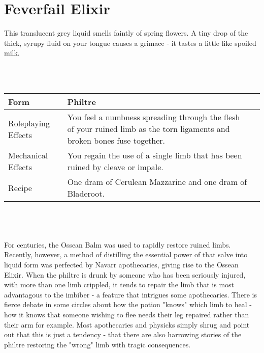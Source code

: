 \documentclass[a5paper,pagesize,10pt,bibtotoc,pointlessnumbers,
normalheadings,DIV=9,twoside=false]{scrbook}
\newcommand\potion[7]{
    \section{#1}
    #2
    \\\\
    \begin{tabular}{| p{.18\linewidth} | p{.74\textwidth} |}
        \hline
        Form & #3 \\
        \hline
        Roleplaying Effects & #4 \\
        \hline
        Mechanical Effects & #5 \\
        \hline
        Recipe & #6 \\
        \hline
    \end{tabular}
    \\\\\\
    #7
    \newpage
}
\begin{document}
\potion{Feverfail Elixir}{
    This translucent grey liquid smells faintly of spring flowers. A tiny drop of the thick, syrupy fluid on your tongue causes a grimace - it tastes a little like spoiled milk.
}{Philtre}{
    You feel nauseous. A dizzying chill spreads through your body, leaving you incapacitated for a few moments. Both effects clear as quickly as they arose, leaving you feeling revitalised.
}{
    You lose the weakness condition.
}{
    One dram of Bladeroot and one dram of Imperial Roseweald.
}{
    This elixir drives out the lingering effects of enervation. It is occasionally useful in treating symptoms that include excessive tiredness or dizziness.
}

\potion{Ossean Solution}{
    This thick, odourless, blue liquid has a gritty texture. When you rub it between finger and thumb it leaves a crusty residue that soon flakes away. It tastes disgusting.
}{Philtre}{
    You feel a numbness spreading through the flesh of your ruined limb as the torn ligaments and broken bones fuse together.
}{
    You regain the use of a single limb that has been ruined by cleave or impale.
}{
    One dram of Cerulean Mazzarine and one dram of Bladeroot.
}{
    For centuries, the Ossean Balm was used to rapidly restore ruined limbs. Recently, however, a method of distilling the essential power of that salve into liquid form was perfected by Navarr apothecaries, giving rise to the Ossean Elixir. When the philtre is drunk by someone who has been seriously injured, with more than one limb crippled, it tends to repair the limb that is most advantagous to the imbiber - a feature that intrigues some apothecaries. There is fierce debate in some circles about how the potion "knows" which limb to heal - how it knows that someone wishing to flee needs their leg repaired rather than their arm for example. Most apothecaries and physicks simply shrug and point out that this is just a tendency - that there are also harrowing stories of the philtre restoring the "wrong" limb with tragic consequences.
}
\end{document}
